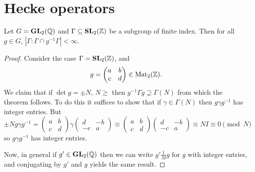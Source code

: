 \documentclass{memoir}
\begin{document}
\chapter{Hecke operators}
\begin{thm}
    Let $G=\mathbf{GL}_2(\mathbb{Q})$ and $\Gamma\subseteq \mathbf{SL}_2(\mathbb{Z})$ be a subgroup of finite index.
    Then for all $g\in G$, $|\Gamma:\Gamma\cap g^{-1}\Gamma | < \infty$.
\end{thm}
\begin{proof}
    Consider the case $\Gamma = \mathbf{SL}_2(\mathbb{Z})$, and 
    \begin{equation}
        g = \begin{pmatrix}
            a & b \\
            c & d
        \end{pmatrix} \in \text{Mat}_2(\mathbb{Z}).
    \end{equation}
    We claim that if $\det g = \pm N$, $N\ge$ then $g^{-1}\Gamma g\supseteq \Gamma(N)$ from which the theorem follows.
    To do this it suffices to show that if $\gamma \in \Gamma(N)$ then $g\gamma g^{-1}$ has integer entries.
    But
    \begin{equation}
        \pm N g \gamma g^{-1} = \begin{pmatrix}
            a & b \\
            c & d
        \end{pmatrix} \gamma
        \begin{pmatrix}
            d & -b \\
            -c & a
        \end{pmatrix} \equiv
        \begin{pmatrix}
            a & b \\
            c & d
        \end{pmatrix} 
        \begin{pmatrix}
            d & -b \\
            -c & a
        \end{pmatrix} \equiv
        NI \equiv 0 \pmod{N}
    \end{equation}
    so $g\gamma g^{-1}$ has integer entries.

    Now, in general if $g'\in\mathbf{GL}_2(\mathbb{Q})$ then we can write $g' \frac1M g$ for $g$ with integer entries, and conjugating by $g'$ and $g$ yields the same result.


\end{proof}
\end{document}
